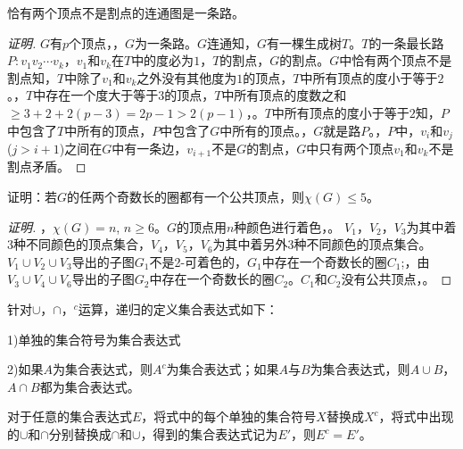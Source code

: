 \documentclass{beamer}
\begin{document}
\begin{CJK}{UTF8}{gbsn}
\begin{frame}
  \begin{Exercise}
    恰有两个顶点不是割点的连通图是一条路。
  \end{Exercise}
  \pause\begin{proof}[证明]\justifying\let\raggedright\justifying{}$G$有$p$个顶点，，$G$为一条路。$G$连通知，\pause $G$有一棵生成树$T$。$T$的一条最长路$P:v_1v_2\cdots v_k$，$v_1$和$v_k$在$T$中的度必为$1$，$T$的割点，$G$的割点。$G$中恰有两个顶点不是割点知，\pause$T$中除了$v_1$和$v_k$之外没有其他度为$1$的顶点，$T$中所有顶点的度小于等于$2$。，$T$中存在一个度大于等于$3$的顶点，$T$中所有顶点的度数之和$\geq 3 + 2 + 2(p-3) = 2p -1 > 2(p-1)$，。$T$中所有顶点的度小于等于$2$知，$P$中包含了$T$中所有的顶点，$P$中包含了$G$中所有的顶点。，\pause $G$就是路$P$。，$P$中，$v_i$和$v_j$($j>i+1$)之间在$G$中有一条边，$v_{i+1}$不是$G$的割点，$G$中只有两个顶点$v_1$和$v_k$不是割点矛盾。
  \end{proof}
\end{frame}
\begin{frame}
  \begin{Exercise}
    证明：若$G$的任两个奇数长的圈都有一个公共顶点，则$\chi(G)\leq 5$。
  \end{Exercise}
  \pause\begin{proof}[证明]\justifying\let\raggedright\justifying
  ，$\chi(G)=n$, $n \geq 6$。$G$的顶点用$n$种颜色进行着色，。
  $V_1$，$V_2$，$V_3$为其中着3种不同颜色的顶点集合，\pause$V_4$，$V_5$，$V_6$为其中着另外3种不同颜色的顶点集合。$V_1\cup V_2\cup V_3$导出的子图$G_1$不是2-可着色的，$G_1$中存在一个奇数长的圈$C_1$;，由$V_3\cup V_4\cup V_6$导出的子图$G_2$中存在一个奇数长的圈$C_2$。\pause$C_1$和$C_2$没有公共顶点，。
\end{proof}
\end{frame}
\begin{frame}
  \begin{Def1}
    针对$\cup$，$\cap$，$^c$运算，递归的定义集合表达式如下：

    1)单独的集合符号为集合表达式

    2)如果$A$为集合表达式，则$A^c$为集合表达式；如果$A$与$B$为集合表达式，则$A\cup B$，$A\cap B$都为集合表达式。
  \end{Def1}
\end{frame}
\begin{frame}
  \begin{Thm4}
    对于任意的集合表达式$E$，将式中的每个单独的集合符号$X$替换成$X^c$，将式中出现的$\cup$和$\cap$分别替换成$\cap$和$\cup$，得到的集合表达式记为$E'$，则$E^c=E'$。
  \end{Thm4}


\end{frame}
\end{CJK}
\end{document}
